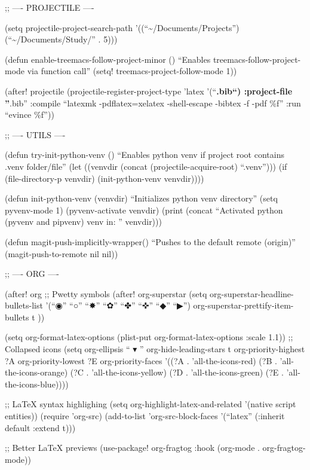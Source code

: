 \documentclass[11pt]{article}
\begin{document}
;; ---- PROJECTILE ----

(setq projectile-project-search-path '((``\textasciitilde{}/Documents/Projects'') (``\textasciitilde{}/Documents/Study/'' . 5)))

(defun enable-treemacs-follow-project-minor ()
  ``Enables treemacs-follow-project-mode via function call''
  (setq! treemacs-project-follow-mode 1))

(after! projectile
        (projectile-register-project-type 'latex '(``\textbf{.bib``)
                :project-file ''}.bib''
                :compile ``latexmk -pdflatex=xelatex -shell-escape -bibtex -f -pdf \%f''
                :run ``evince \%f''))

;; ---- UTILS ----

(defun try-init-python-venv ()
  ``Enables python venv if project root contains .venv folder/file''
  (let ((venvdir (concat (projectile-acquire-root) ``.venv'')))
    (if (file-directory-p venvdir)
        (init-python-venv venvdir))))

(defun init-python-venv (venvdir)
  ``Initializes python venv directory''
        (setq pyvenv-mode 1)
        (pyvenv-activate venvdir)
        (print (concat ``Activated python (pyvenv and pipvenv) venv in: '' venvdir)))

(defun magit-push-implicitly-wrapper()
  ``Pushes to the default remote (origin)''
  (magit-push-to-remote nil nil))

;; ---- ORG ----

(after! org
  ;; Pwetty symbols
  (after! org-superstar
    (setq org-superstar-headline-bullets-list '(``◉'' ``○'' ``✸'' ``✿'' ``✤'' ``✜'' ``◆'' ``▶'')
          org-superstar-prettify-item-bullets t ))

(setq org-format-latex-options (plist-put org-format-latex-options :scale 1.1))
;; Collapsed icons
(setq org-ellipsis `` ▾ ''
      org-hide-leading-stars t
      org-priority-highest ?A
      org-priority-lowest ?E
      org-priority-faces
      '((?A . 'all-the-icons-red)
        (?B . 'all-the-icons-orange)
        (?C . 'all-the-icons-yellow)
        (?D . 'all-the-icons-green)
        (?E . 'all-the-icons-blue))))

;; \LaTeX{} syntax highlighing
(setq org-highlight-latex-and-related '(native script entities))
(require 'org-src)
(add-to-list 'org-src-block-faces '(``latex'' (:inherit default :extend t)))

;; Better \LaTeX{} previews
(use-package! org-fragtog
  :hook (org-mode . org-fragtog-mode))
\end{document}

